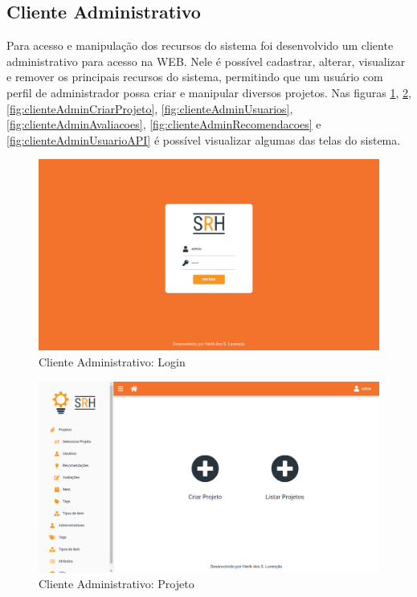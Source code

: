 \subsection{Cliente Administrativo}

Para acesso e manipulação dos recursos do sistema foi desenvolvido um cliente administrativo para acesso na WEB. Nele é possível cadastrar, alterar, visualizar e remover os principais recursos do sistema, permitindo que um usuário com perfil de administrador possa criar e manipular diversos projetos. Nas figuras \ref{fig:clienteAdminLogin}, \ref{fig:clienteAdminProjeto}, \ref{fig:clienteAdminCriarProjeto}, \ref{fig:clienteAdminUsuarios}, \ref{fig:clienteAdminAvaliacoes}, \ref{fig:clienteAdminRecomendacoes} e \ref{fig:clienteAdminUsuarioAPI} é possível visualizar algumas das telas do sistema.

\begin{figure}[H]
	\centering
	\includegraphics[width=.9\linewidth]{imagens/adminLogin.png}
	\caption[Cliente Administrativo: Login]{Cliente Administrativo: Login}
    \label{fig:clienteAdminLogin}
\end{figure}

\begin{figure}[H]
	\centering
	\includegraphics[width=.9\linewidth]{imagens/adminCriarProjeto.png}
	\caption[Cliente Administrativo: Projeto]{Cliente Administrativo: Projeto}
    \label{fig:clienteAdminProjeto}
\end{figure}

